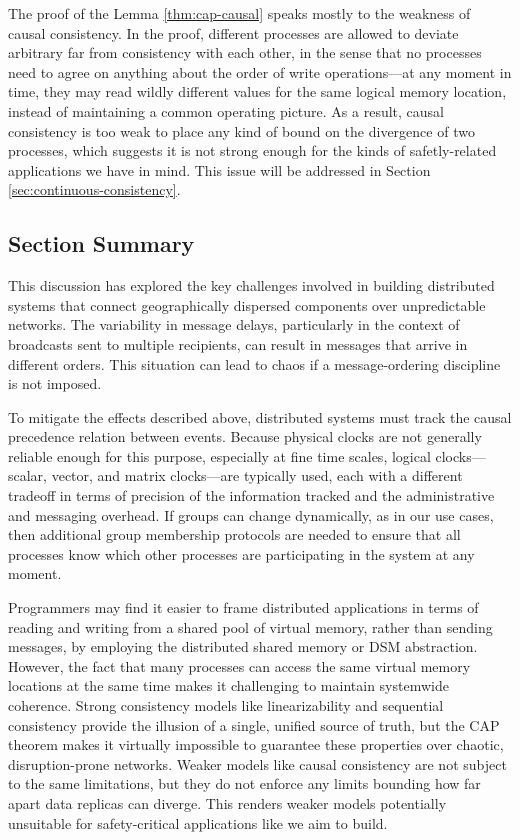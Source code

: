 \documentclass[]             %
{NASA}                       %
\theoremstyle{definition}
\begin{document}
The proof of the Lemma \ref{thm:cap-causal} speaks mostly to the
weakness of causal consistency. In the proof, different processes are
allowed to deviate arbitrary far from consistency with each other, in
the sense that no processes need to agree on anything about the order
of write operations---at any moment in time, they may read wildly
different values for the same logical memory location, instead of
maintaining a common operating picture. As a result, causal
consistency is too weak to place any kind of bound on the divergence
of two processes, which suggests it is not strong enough for the kinds
of safetly-related applications we have in mind. This issue will be
addressed in Section \ref{sec:continuous-consistency}.

\subsection{Section Summary}
\label{ssec:background-summary}
This discussion has explored the key challenges involved in building
distributed systems that connect geographically dispersed components
over unpredictable networks. The variability in message delays,
particularly in the context of broadcasts sent to multiple recipients,
can result in messages that arrive in different orders.  This
situation can lead to chaos if a message-ordering discipline is not
imposed.

To mitigate the effects described above, distributed systems must
track the causal precedence relation between events. Because physical
clocks are not generally reliable enough for this purpose, especially
at fine time scales, logical clocks---scalar, vector, and matrix
clocks---are typically used, each with a different tradeoff in terms
of precision of the information tracked and the administrative and
messaging overhead. If groups can change dynamically, as in our use
cases, then additional group membership protocols are needed to ensure
that all processes know which other processes are participating in the
system at any moment.

Programmers may find it easier to frame distributed applications in
terms of reading and writing from a shared pool of virtual memory,
rather than sending messages, by employing the distributed shared
memory or DSM abstraction. However, the fact that many processes can
access the same virtual memory locations at the same time makes it
challenging to maintain systemwide coherence. Strong consistency
models like linearizability and sequential consistency provide the
illusion of a single, unified source of truth, but the CAP theorem
makes it virtually impossible to guarantee these properties over
chaotic, disruption-prone networks. Weaker models like causal
consistency are not subject to the same limitations, but they do not
enforce any limits bounding how far apart data replicas can
diverge. This renders weaker models potentially unsuitable for
safety-critical applications like we aim to build.
\end{document}
